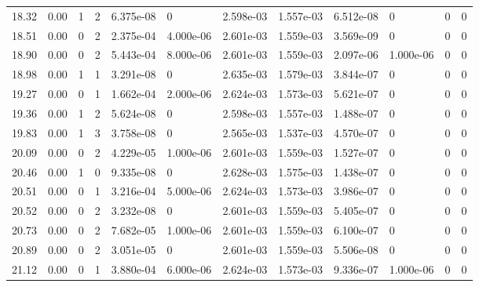 \documentclass[preview]{standalone}
\begin{document}
{{{\begin{tabular}{L{1.2cm}C{1.2cm} C{0.3cm}C{0.5cm} C{1.4cm}C{1.4cm} C{1.4cm}C{1.4cm} C{1.6cm}C{1.6cm} C{1.6cm}C{1.6cm}}
  18.32  &  0.00  & 1     &  2 &  6.375e-08  & 0  &  2.598e-03&   1.557e-03& 6.512e-08 & 0   &  0 & 0  \\ 
  18.51  &  0.00  & 0     &  2 &  2.375e-04  & 4.000e-06  &  2.601e-03&   1.559e-03& 3.569e-09 & 0   &  0 & 0  \\ 
  18.90  &  0.00  & 0     &  2 &  5.443e-04  & 8.000e-06  &  2.601e-03&   1.559e-03& 2.097e-06 & 1.000e-06   &  0 & 0  \\ 
  18.98  &  0.00  & 1     &  1 &  3.291e-08  & 0  &  2.635e-03&   1.579e-03& 3.844e-07 & 0   &  0 & 0  \\ 
  19.27  &  0.00  & 0     &  1 &  1.662e-04  & 2.000e-06  &  2.624e-03&   1.573e-03& 5.621e-07 & 0   &  0 & 0  \\ 
  19.36  &  0.00  & 1     &  2 &  5.624e-08  & 0  &  2.598e-03&   1.557e-03& 1.488e-07 & 0   &  0 & 0  \\ 
  19.83  &  0.00  & 1     &  3 &  3.758e-08  & 0  &  2.565e-03&   1.537e-03& 4.570e-07 & 0   &  0 & 0  \\ 
  20.09  &  0.00  & 0     &  2 &  4.229e-05  & 1.000e-06  &  2.601e-03&   1.559e-03& 1.527e-07 & 0   &  0 & 0  \\ 
  20.46  &  0.00  & 1     &  0 &  9.335e-08  & 0  &  2.628e-03&   1.575e-03& 1.438e-07 & 0   &  0 & 0  \\ 
  20.51  &  0.00  & 0     &  1 &  3.216e-04  & 5.000e-06  &  2.624e-03&   1.573e-03& 3.986e-07 & 0   &  0 & 0  \\ 
  20.52  &  0.00  & 0     &  2 &  3.232e-08  & 0  &  2.601e-03&   1.559e-03& 5.405e-07 & 0   &  0 & 0  \\ 
  20.73  &  0.00  & 0     &  2 &  7.682e-05  & 1.000e-06  &  2.601e-03&   1.559e-03& 6.100e-07 & 0   &  0 & 0  \\ 
  20.89  &  0.00  & 0     &  2 &  3.051e-05  & 0  &  2.601e-03&   1.559e-03& 5.506e-08 & 0   &  0 & 0  \\ 
  21.12  &  0.00  & 0     &  1 &  3.880e-04  & 6.000e-06  &  2.624e-03&   1.573e-03& 9.336e-07 & 1.000e-06   &  0 & 0  \\ 
\hline 
\end{tabular} 

}}}
\end{document}
